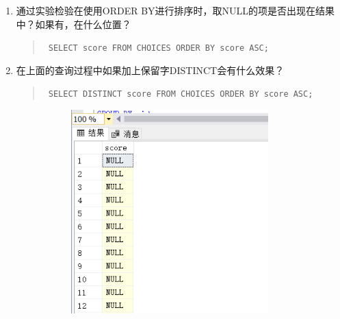 \documentclass[a4paper,twoside]{article}
\begin{document}
\begin{spacing}{1.2}
\begin{enumerate}
\item 通过实验检验在使用ORDER BY进行排序时，取NULL的项是否出现在结果中？如果有，在什么位置？
\begin{quote}
\texttt{
SELECT score FROM CHOICES ORDER BY score ASC;
}
\end{quote}
\item 在上面的查询过程中如果加上保留字DISTINCT会有什么效果？
\begin{quote}
\texttt{
SELECT DISTINCT score FROM CHOICES ORDER BY  score ASC;
}
\end{quote}


\begin{figure}[h]
\centering
\caption{运行结果}
\begin{subfigure}{0.3\textwidth}
  \includegraphics[width=0.9\textwidth]{fig30.png}
\end{subfigure}
\begin{subfigure}{0.3\textwidth}

\end{subfigure}
\end{figure}
\end{enumerate}
\end{spacing}
\end{document}
